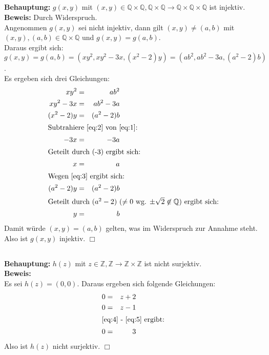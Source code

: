 \documentclass[10pt,a4paper,oneside,ngerman,numbers=noenddot]{scrartcl}
\begin{document}
\subsection{}
\textbf{Behauptung:} $g(x,y)$ mit $(x,y) \in \mathbb{Q} \times \mathbb{Q}, \mathbb{Q} \times \mathbb{Q} \rightarrow \mathbb{Q} \times \mathbb{Q} \times \mathbb{Q}$ ist injektiv.\\
\textbf{Beweis:} Durch Widerspruch.\\
Angenommen $g(x,y)$ sei nicht injektiv, dann gilt $(x,y) \neq (a,b)$ mit $(x,y),(a,b) \in \mathbb{Q} \times \mathbb{Q}$ und $g(x,y) = g(a,b)$.\\
Daraus ergibt sich:
$g(x,y) = g(a,b) = (xy^{2},xy^{2}-3x,(x^{2}-2)y) = (ab^{2},ab^{2}-3a,(a^{2}-2)b)$.\\
Es ergeben sich drei Gleichungen:
\begin{alignat}{2}
\label{eq:1} xy^{2} &=& ab^{2} \\
\label{eq:2} xy^{2}-3x &=& ab^{2}-3a \\
(x^{2}-2)y &=& (a^{2}-2)b \\
\intertext{Subtrahiere \eqref{eq:2} von \eqref{eq:1}:}
-3x &=& -3a \\
\intertext{Geteilt durch (-3) ergibt sich:}
\label{eq:3} x &=& a\\
\intertext{Wegen \eqref{eq:3} ergibt sich:}
(a^{2}-2)y &=& (a^{2}-2)b \\
\intertext{Geteilt durch $(a^{2}-2)$ ($\neq 0$ wg. $\pm \sqrt{2} \not\in \mathbb{Q}$) ergibt sich:}
y &=& b
\end{alignat}
Damit würde $(x,y) = (a,b)$ gelten, was im Widerspruch zur Annahme steht. Also ist $g(x,y)$ injektiv. \hfill $\Box$

\subsection{}
\textbf{Behauptung:} $h(z)$ mit $z \in \mathbb{Z}, \mathbb{Z} \rightarrow \mathbb{Z} \times \mathbb{Z}$ ist nicht surjektiv.\\
\textbf{Beweis:}\\
Es sei $h(z) = (0,0)$. Daraus ergeben sich folgende Gleichungen:
\begin{alignat}{2}
\label{eq:4} 0 &=& z+2 \\
\label{eq:5} 0 &=& z-1 \\
\intertext{\eqref{eq:4} - \eqref{eq:5} ergibt:}
0 &=& 3
\end{alignat}
Also ist $h(z)$ nicht surjektiv. \hfill $\Box$
\end{document}
